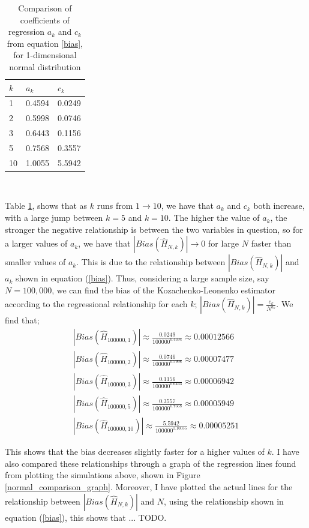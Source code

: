 \documentclass{article}
\begin{document}
\begin{table}
\caption{Comparison of coefficients of regression $a_{k}$ and $c_{k}$ from equation \ref{bias}, for 1-dimensional normal distribution} \label{normal_a_c_compare_table}
\begin{center}
\begin{tabular}{| l | l l |} 
\toprule
$k$ &  $a_{k}$ & $c_{k}$ \\
\midrule[1pt]
1      & 0.4594     & 0.0249  \\
2      & 0.5998     & 0.0746  \\
3      & 0.6443     & 0.1156  \\
5      & 0.7568     & 0.3557  \\
10    & 1.0055     & 5.5942  \\
\hline
\end{tabular}
\\[10pt]
\end{center}
\end{table}

Table \ref{normal_a_c_compare_table}, shows that as $k$ runs from $1 \to 10$, we have that $a_{k}$ and $c_{k}$ both increase, with a large jump between $k=5$ and $k=10$. The higher the value of $a_{k}$, the stronger the negative relationship is between the two variables in question, so for a larger values of $a_{k}$, we have that $|Bias(\hat{H}_{N, k})| \to 0$ for large $N$ faster than smaller values of $a_{k}$. This is due to the relationship between $|Bias(\hat{H}_{N, k})|$ and $a_{k}$ shown in equation (\ref{bias}). Thus, considering a large sample size, say $N=100,000$, we can find the bias of the Kozachenko-Leonenko estimator according to the regressional relationship for each $k$; $|Bias(\hat{H}_{N, k})| = \frac{c_{k}}{N^{a_{k}}}$. We find that;
\begin{gather*}
|Bias(\hat{H}_{100000, 1})| \approx  \frac{0.0249}{100000^{0.4594}}   \approx 0.00012566 \\
|Bias(\hat{H}_{100000, 2})| \approx  \frac{0.0746}{100000^{0.5998}}   \approx 0.00007477 \\
|Bias(\hat{H}_{100000, 3})| \approx  \frac{0.1156}{100000^{0.6443}}   \approx 0.00006942 \\
|Bias(\hat{H}_{100000, 5})| \approx  \frac{0.3557}{100000^{0.7568}}   \approx 0.00005949 \\
|Bias(\hat{H}_{100000, 10})| \approx  \frac{5.5942}{100000^{1.10055}}   \approx 0.00005251 
\end{gather*}

This shows that the bias decreases slightly faster for a higher values of $k$. I have also compared these relationships through a graph of the regression lines found from plotting the simulations above, shown in Figure \ref{normal_comparison_graph}. Moreover, I have plotted the actual lines for the relationship between $|Bias(\hat{H}_{N, k})|$ and $N$, using the relationship shown in equation (\ref{bias}), this shows that ... TODO.
\end{document}
